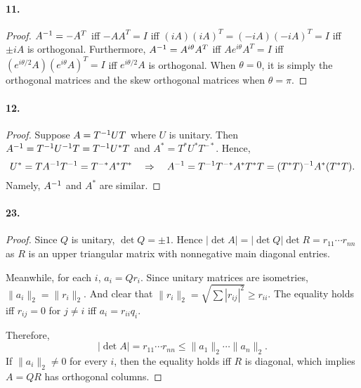  \paragraph{11.}
  \begin{proof}
    $A^{-1}=-A^T$ iff $-AA^T=I$ iff $(iA)(iA)^T=(-iA)(-iA)^T=I$ iff $\pm iA$ is
    orthogonal. Furthermore, $A^{-1} = A^{i\theta}A^T$ iff $Ae^{i\theta}A^T=I$ 
    iff $(e^{i\theta/2}A)(e^{i\theta}A)^T=I$ iff $e^{i\theta/2}A$ is orthogonal.
    When $\theta=0$, it is simply the orthogonal matrices and the skew 
    orthogonal matrices when $\theta=\pi$.
  \end{proof}

  \paragraph{12.}
  \begin{proof}
    Suppose $A=T^{-1} UT$ where $U$ is unitary. Then $A^{-1} = T^{-1} U^{-1} T=T^{-1}
    U^*T$ and $A^* = T^*U^*T^{-*}$. Hence, 
    \[
      U^*=TA^{-1} T^{-1} = T^{-*}A^*T^* \quad\Rightarrow\quad
      A^{-1} = T^{-1} T^{-*} A^* T^*T = (T^*T)^{-1} A^* (T^*T).
    \]
    Namely, $A^{-1}$ and $A^*$ are similar.
  \end{proof}

  \paragraph{23.}
  \begin{proof}
    Since $Q$ is unitary, $\det Q=\pm 1$. Hence $|\det A|=|\det Q|\det R=r_{11}
    \cdots r_{nn}$ as $R$ is an upper triangular matrix with nonnegative main
    diagonal entries.\par
    Meanwhile, for each $i$, $a_i=Qr_i$. Since unitary matrices are isometries,
    $\|a_i\|_2=\|r_i\|_2$. And clear that $\|r_i\|_2=\sqrt{\sum|r_{ij}|^2}\ge 
    r_{ii}$. The equality holds iff $r_{ij}=0$ for $j\ne i$ iff $a_i=r_{ii}q_i$.
    \par
    Therefore, 
    \[
      |\det A|=r_{11}\cdots r_{nn} \le \|a_1\|_2\cdots\|a_n\|_2.
    \]
    If $\|a_i\|_2\ne 0$ for every $i$, then the equality holds iff $R$ is 
    diagonal, which implies $A=QR$ has orthogonal columns. 
  \end{proof}
